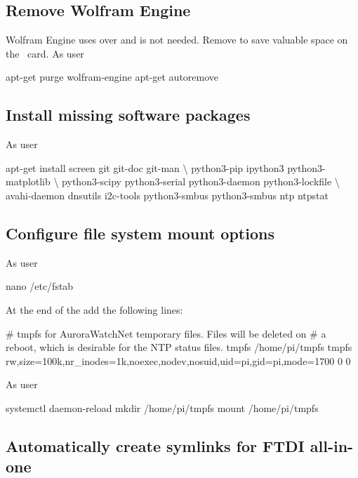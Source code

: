 \subsection{Remove Wolfram Engine}
Wolfram Engine uses over  and is not needed. Remove to save
valuable space on the \sd\ card. As user \rootUser
\begin{Cmd}
apt-get purge wolfram-engine
apt-get autoremove
\end{Cmd}


\subsection{Install missing software packages}
As user \rootUser
\begin{Cmd}
apt-get install screen git git-doc git-man \textbackslash
    python3-pip ipython3 python3-matplotlib \textbackslash
    python3-scipy python3-serial python3-daemon python3-lockfile \textbackslash
    avahi-daemon dnsutils i2c-tools python3-smbus python3-smbus ntp ntpstat
\end{Cmd}

\subsection{Configure file system mount options}

As user \rootUser
\begin{Cmd}
nano /etc/fstab  
\end{Cmd}

At the end of the  add the following lines:
\begin{Cmd}[fontsize=\relsize{-2.5}]
# tmpfs for AuroraWatchNet temporary files. Files will be deleted on 
# a reboot, which is desirable for the NTP status files.
tmpfs  /home/pi/tmpfs  tmpfs  rw,size=100k,nr_inodes=1k,noexec,nodev,nosuid,uid=pi,gid=pi,mode=1700  0  0
\end{Cmd}

As user \rootUser
\begin{Cmd}
systemctl daemon-reload
mkdir /home/pi/tmpfs
mount /home/pi/tmpfs
\end{Cmd}

\subsection{Automatically create symlinks for FTDI all-in-one}

